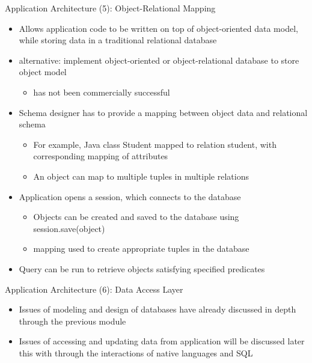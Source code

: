 \documentclass[aspectratio=169, xcolor=dvipsnames]{beamer}
\begin{document}
\begin{frame}{Application Architecture (5): Object-Relational Mapping}
    \begin{itemize}[<+->]
        \item Allows application code to be written on top of object-oriented data model, while storing data in a traditional relational database
        \item alternative: implement object-oriented or object-relational database to store object model
        \begin{itemize}
            \item[$\triangleright$] has not been commercially successful
        \end{itemize}
        \item Schema designer has to provide a mapping between object data and relational schema
        \begin{itemize}
            \item[$\triangleright$] For example, Java class Student mapped to relation student, with corresponding mapping of attributes
            \item[$\triangleright$] An object can map to multiple tuples in multiple relations
        \end{itemize}
        \item Application opens a session, which connects to the database
        \begin{itemize}
            \item[$\triangleright$] Objects can be created and saved to the database using session.save(object)
            \item[$\triangleright$] mapping used to create appropriate tuples in the database
        \end{itemize}
        \item Query can be run to retrieve objects satisfying specified predicates
    \end{itemize}
\end{frame}

\begin{frame}{Application Architecture (6): Data Access Layer}
    \begin{itemize}
        \item Issues of modeling and design of databases have already discussed in depth through the previous module
        \item Issues of accessing and updating data from application will be discussed later this with through the interactions of native languages and SQL
    \end{itemize}
\end{frame}
\end{document}

